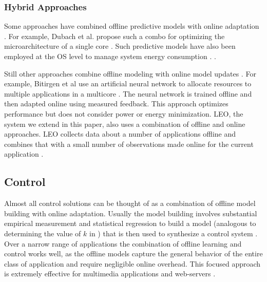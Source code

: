 \subsubsection{Hybrid Approaches}
Some approaches have combined offline predictive models with online
adaptation
\cite{Zhang2012,packandcap,Winter2010,dubach2010,Koala,Cinder,
  wu2012inferred}.  For example, Dubach et al.  propose such a combo
for optimizing the microarchitecture of a single core
\cite{dubach2010}.  Such predictive models have also been employed at
the OS level to manage system energy consumption \cite{Koala,Cinder}.
\cite{wu2012inferred}.


Still other approaches combine offline modeling with online model
updates \cite{JouleGuard,Bitirgen2008,Ipek}.  For example, Bitirgen et
al use an artificial neural network to allocate resources to multiple
applications in a multicore \cite{Bitirgen2008}.  The neural network
is trained offline and then adapted online using measured feedback.
This approach optimizes performance but does not consider power or
energy minimization.  LEO, the system we extend in this paper, also
uses a combination of offline and online approaches.  LEO collects
data about a number of applications offline and combines that with a
small number of observations made online for the current application
\cite{LEO}.

\subsection{Control}
Almost all control solutions can be thought of as a combination of
offline model building with online adaptation.  Usually the model
building involves substantial empirical measurement and statistical
regression to build a model (analogous to determining the value of $k$
in ) that is then used to synthesize a control system
\cite{Wu2004,TCST,Chen2011,PTRADE,Heartbeats2,ControlWare,Agilos,Rajkumar,Sojka,Raghavendra2008}.
Over a narrow range of applications the combination of offline
learning and control works well, as the offline models capture the
general behavior of the entire class of application and require
negligible online overhead.  This focused approach is extremely
effective for multimedia applications
\cite{grace2,flinn99,flinn2004,xtune,TCST} and web-servers
\cite{Horvarth,LuEtAl-2006a,SunDaiPan-2008a}.  


